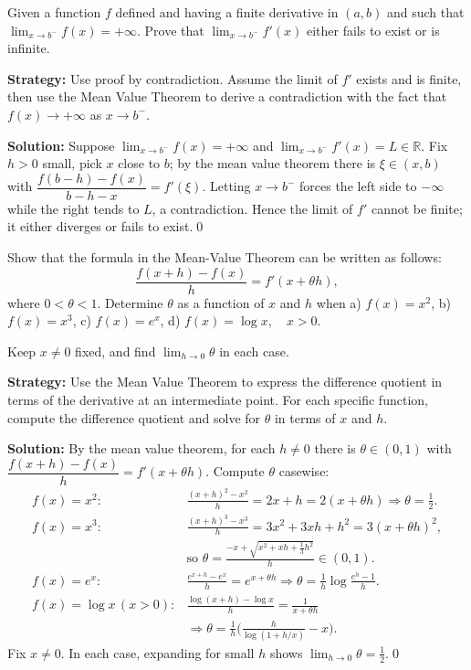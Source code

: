 \begin{problembox}
Given a function \( f \) defined and having a finite derivative in \( (a, b) \) and such that \( \lim_{x \to b^-} f(x) = +\infty \). Prove that \( \lim_{x \to b^-} f'(x) \) either fails to exist or is infinite.
\end{problembox}

\noindent\textbf{Strategy:} Use proof by contradiction. Assume the limit of \( f' \) exists and is finite, then use the Mean Value Theorem to derive a contradiction with the fact that \( f(x) \to +\infty \) as \( x \to b^- \).

\bigskip\noindent\textbf{Solution:}
Suppose $\lim_{x\to b^-}f(x)=+\infty$ and $\lim_{x\to b^-}f'(x)=L\in\mathbb{R}$. Fix $h>0$ small, pick $x$ close to $b$; by the mean value theorem there is $\xi\in(x,b)$ with $\dfrac{f(b-h)-f(x)}{b-h-x}=f'(\xi)$. Letting $x\to b^-$ forces the left side to $-\infty$ while the right tends to $L$, a contradiction. Hence the limit of $f'$ cannot be finite; it either diverges or fails to exist.\qed


\begin{problembox}
Show that the formula in the Mean-Value Theorem can be written as follows:
\[ \frac{f(x+h)-f(x)}{h} = f'(x+\theta h), \]
where \( 0 < \theta < 1 \). Determine \( \theta \) as a function of \( x \) and \( h \) when 
a) \( f(x) = x^2 \), 
b) \( f(x) = x^3 \), 
c) \( f(x) = e^x \), 
d) \( f(x) = \log x, \quad x > 0 \).

Keep \( x \neq 0 \) fixed, and find \( \lim_{h \to 0} \theta \) in each case.
\end{problembox}

\noindent\textbf{Strategy:} Use the Mean Value Theorem to express the difference quotient in terms of the derivative at an intermediate point. For each specific function, compute the difference quotient and solve for \( \theta \) in terms of \( x \) and \( h \).

\bigskip\noindent\textbf{Solution:}
By the mean value theorem, for each $h\ne 0$ there is $\theta\in(0,1)$ with $\dfrac{f(x+h)-f(x)}{h}=f'(x+\theta h)$. Compute $\theta$ casewise:
\[\begin{aligned}
f(x)=x^2:&\frac{(x+h)^2-x^2}{h}=2x+h=2(x+\theta h)\Rightarrow\theta=\tfrac12.\\
f(x)=x^3:&\frac{(x+h)^3-x^3}{h}=3x^2+3xh+h^2=3(x+\theta h)^2,\\
& \text{so }\theta=\frac{-x+\sqrt{x^2+xh+\tfrac13 h^2}}{h}\in(0,1).\\
f(x)=e^x:&\frac{e^{x+h}-e^x}{h}=e^{x+\theta h}\Rightarrow \theta=\frac1h\log\frac{e^h-1}{h}.\\
f(x)=\log x\,(x>0):&\frac{\log(x+h)-\log x}{h}=\frac{1}{x+\theta h} \\
& \Rightarrow \theta=\frac{1}{h}\Big(\frac{h}{\log(1+h/x)}-x\Big).
\end{aligned}\]
Fix $x\ne 0$. In each case, expanding for small $h$ shows $\lim_{h\to 0}\theta=\tfrac12$.\qed


